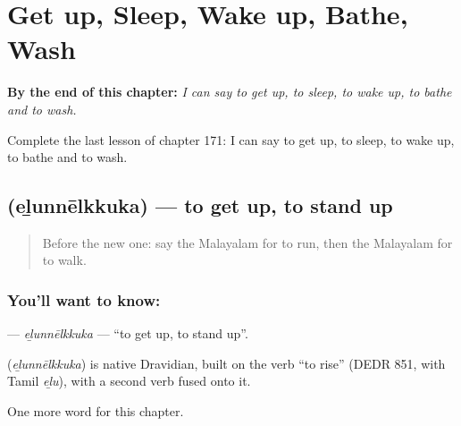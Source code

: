 
\chapter{Get up, Sleep, Wake up, Bathe, Wash}
\label{ch:ml-get-up-sleep-wake-up-bathe-wash}

\begin{chapteropening}
\textbf{By the end of this chapter:} \emph{I can say to get up, to sleep, to wake up, to bathe and to wash.}

Complete the last lesson of chapter 171: I can say to get up, to sleep, to wake up, to bathe and to wash.
\end{chapteropening}

\section[\texorpdfstring{\ml{എഴുന്നേൽക്കുക} (eḻunnēlkkuka)}{എഴുന്നേൽക്കുക (eḻunnēlkkuka)}]{ (eḻunnēlkkuka) — to get up, to stand up}

\label{lesson:ML-C171-elunnelkkuka}



\begin{quote}
Before the new one: say the Malayalam for to run, then the Malayalam for to walk.
\end{quote}

\subsection*{You'll want to know: }
\textbf{} — \emph{eḻunnēlkkuka} — \textquotedblleft{}to get up, to stand up\textquotedblright{}.

\begin{cousinweb}
\textbf{} (\emph{eḻunnēlkkuka}) is native Dravidian, built on the verb \textquotedblleft{}to rise\textquotedblright{} (DEDR 851, with Tamil \emph{eḻu}), with a second verb fused onto it.
\end{cousinweb}

\begin{grammarlens}[title={What you've built}]
One more word for this chapter.
\end{grammarlens}

